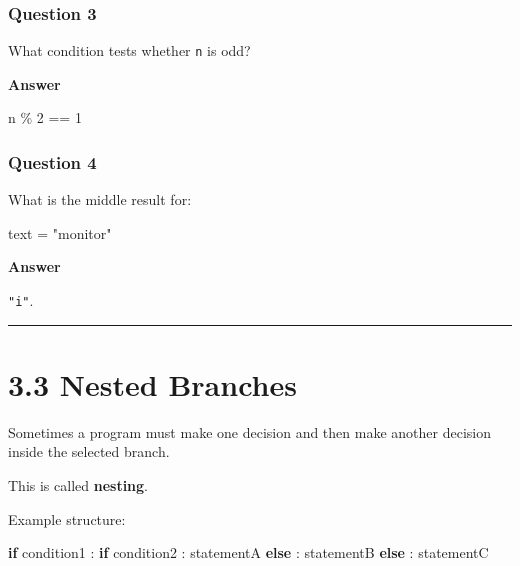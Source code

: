 \documentclass[
  11pt,
  a4paper,
]{article}
\newenvironment{Shaded}{}{}
\newcommand{\ControlFlowTok}[1]{\textcolor[rgb]{0.00,0.44,0.13}{\textbf{#1}}}
\newcommand{\DecValTok}[1]{\textcolor[rgb]{0.25,0.63,0.44}{#1}}
\newcommand{\NormalTok}[1]{#1}
\newcommand{\OperatorTok}[1]{\textcolor[rgb]{0.40,0.40,0.40}{#1}}
\newcommand{\StringTok}[1]{\textcolor[rgb]{0.25,0.44,0.63}{#1}}
\begin{document}
\subsubsection{Question 3}\label{question-3-1}

What condition tests whether \texttt{n} is odd?

\textbf{Answer}

\begin{Shaded}
\begin{Highlighting}[]
\NormalTok{n }\OperatorTok{\%} \DecValTok{2} \OperatorTok{==} \DecValTok{1}
\end{Highlighting}
\end{Shaded}

\subsubsection{Question 4}\label{question-4-1}

What is the middle result for:

\begin{Shaded}
\begin{Highlighting}[]
\NormalTok{text }\OperatorTok{=} \StringTok{"monitor"}
\end{Highlighting}
\end{Shaded}

\textbf{Answer}

\texttt{"i"}.

\begin{center}\rule{0.5\linewidth}{0.5pt}\end{center}

\section{3.3 Nested Branches}\label{nested-branches}

Sometimes a program must make one decision and then make another
decision inside the selected branch.

This is called \textbf{nesting}.

Example structure:

\begin{Shaded}
\begin{Highlighting}[]
\ControlFlowTok{if}\NormalTok{ condition1 :}
    \ControlFlowTok{if}\NormalTok{ condition2 :}
\NormalTok{        statementA}
    \ControlFlowTok{else}\NormalTok{ :}
\NormalTok{        statementB}
\ControlFlowTok{else}\NormalTok{ :}
\NormalTok{    statementC}
\end{Highlighting}
\end{Shaded}
\end{document}
